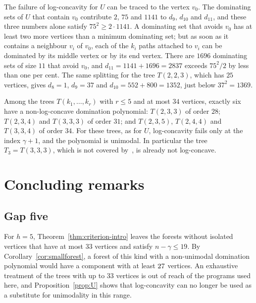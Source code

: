 \begin{remark}\label{rem:mechanism}
The failure of log-concavity for $U$ can be traced to the vertex $v_0$. The
dominating sets of $U$ that contain $v_0$ contribute $2$, $75$ and $1141$ to
$d_9$, $d_{10}$ and $d_{11}$, and these three numbers alone satisfy
$75^2\ge2\cdot1141$. A dominating set that avoids $v_0$ has at least two more
vertices than a minimum dominating set; but as soon as it contains a
neighbour $v_i$ of $v_0$, each of the $k_i$ paths attached to $v_i$ can be
dominated by its middle vertex or by its end vertex. There are $1696$
dominating sets of size $11$ that avoid $v_0$, and
$d_{11}=1141+1696=2837$ exceeds $75^2/2$ by less than one per cent. The same
splitting for the tree $T(2,2,3)$, which has $25$ vertices, gives $d_8=1$,
$d_9=37$ and $d_{10}=552+800=1352$, just below $37^2=1369$.
\end{remark}

\begin{remark}\label{rem:family}
Among the trees $T(k_1,\dots,k_r)$ with $r\le5$ and at most $34$ vertices,
exactly six have a non-log-concave domination polynomial: $T(2,3,3)$ of
order $28$; $T(2,3,4)$ and $T(3,3,3)$ of order $31$; and $T(2,3,5)$,
$T(2,4,4)$ and $T(3,3,4)$ of order $34$. For these trees, as for $U$,
log-concavity fails only at the index $\gamma+1$, and the polynomial is
unimodal. In particular the tree $T_3=T(3,3,3)$, which is not covered
by~\cite[Proposition~1]{BS}, is already not log-concave.
\end{remark}


\section{Concluding remarks}\label{sec:remarks}

\subsection*{Gap five}
For $h=5$, Theorem~\ref{thm:criterion-intro} leaves the forests without
isolated vertices that have at most $33$ vertices and satisfy
$n-\gamma\le19$. By Corollary~\ref{cor:smallforest}, a forest of this kind
with a non-unimodal domination polynomial would have a component with at
least $27$ vertices. An exhaustive treatment of the trees with up to
$33$ vertices is out of reach of the programs used here, and
Proposition~\ref{prop:U} shows that log-concavity can no longer be used as
a substitute for unimodality in this range.

